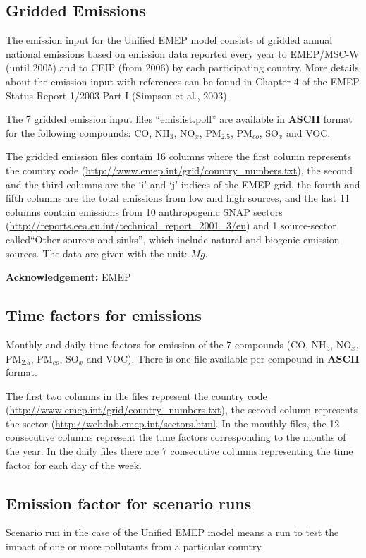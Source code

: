 \subsection{Gridded Emissions}
The emission input for the Unified EMEP model consists of gridded
annual national emissions based on emission data reported every year
to EMEP/MSC-W (until 2005) 
and to CEIP (from 2006) by each
participating country. 
More details about the emission input with references can be
found in Chapter 4 of the EMEP Status Report 1/2003 Part I 
(Simpson et al., 2003).

The 7 gridded emission input files ``emislist.poll'' are available in 
{\bf ASCII} format for the following compounds: CO, NH$_{3}$,
NO$_{x}$, PM$_{2.5}$, PM$_{co}$, SO$_{x}$ and VOC.

The gridded emission files contain 16 columns where the first column 
represents the country code
(\url{http://www.emep.int/grid/country_numbers.txt}), 
the second and the third columns are the `i' and `j' indices of the
EMEP grid, the fourth and fifth columns are the total emissions from
low and high sources, and the last 11 columns contain emissions from 
10 anthropogenic SNAP sectors 
(\url{http://reports.eea.eu.int/technical_report_2001_3/en}) and 1 
source-sector called``Other sources and sinks'', which include natural and
biogenic emission sources. The data are given with the unit: $Mg$.

{\bf Acknowledgement:} EMEP

\subsection{Time factors for emissions}

Monthly and daily time factors for emission of the 7 compounds 
(CO, NH$_{3}$, NO$_{x}$, PM$_{2.5}$, PM$_{co}$, SO$_{x}$ and VOC). 
There is one file available per compound in {\bf ASCII} format. 

The first two columns in the files represent the country code
(\url{http://www.emep.int/grid/country_numbers.txt}), the second column 
represents the sector (\url{http://webdab.emep.int/sectors.html}. In the monthly files, 
the 12 consecutive columns represent the time factors corresponding to 
the months of the year. In the daily files there are 7 consecutive columns representing 
the time factor for each day of the week. 


\subsection{Emission factor for scenario runs}\label{sec:femis}
Scenario run in the case of the Unified EMEP model means a run to test
the impact of one or more pollutants from a particular
country. 

